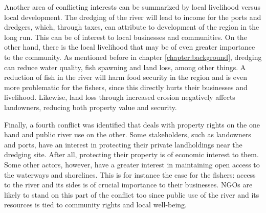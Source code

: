 Another area of conflicting interests can be summarized by local livelihood versus local development. The dredging of the river will lead to income for the ports and dredgers, which, through taxes, can attribute to development of the region in the long run. This can be of interest to local businesses and communities. On the other hand, there is the local livelihood that may be of even greater importance to the community. As mentioned before in chapter \ref{chapter:background}, dredging can reduce water quality, fish spawning and land loss, among other things. A reduction of fish in the river will harm food security in the region and is even more problematic for the fishers, since this directly hurts their businesses and livelihood. Likewise, land loss through increased erosion negatively affects landowners, reducing both property value and security.

Finally, a fourth conflict was identified that deals with property rights on the one hand and public river use on the other. Some stakeholders, such as landowners and ports, have an interest in protecting their private landholdings near the dredging site. After all, protecting their property is of economic interest to them. Some other actors, however, have a greater interest in maintaining open access to the waterways and shorelines. This is for instance the case for the fishers: access to the river and its sides is of crucial importance to their businesses. NGOs are likely to stand on this part of the conflict too since public use of the river and its resources is tied to community rights and local well-being.



